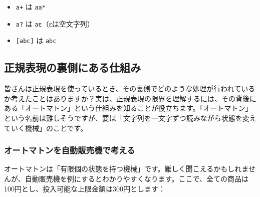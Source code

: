 \begin{itemize}
\tightlist
\item
  \texttt{a+} は \texttt{aa*}
\item
  \texttt{a?} は \texttt{a\textbar{}ε}（εは空文字列）
\item
  \texttt{{[}abc{]}} は \texttt{a\textbar{}b\textbar{}c}
\end{itemize}

\hypertarget{chapter4-ux6b63ux898fux8868ux73feux306eux88cfux5074ux306bux3042ux308bux4ed5ux7d44ux307f}{%
\subsection{正規表現の裏側にある仕組み}\label{chapter4-ux6b63ux898fux8868ux73feux306eux88cfux5074ux306bux3042ux308bux4ed5ux7d44ux307f}}

皆さんは正規表現を使っているとき、その裏側でどのような処理が行われているか考えたことはありますか？実は、正規表現の限界を理解するには、その背後にある「オートマトン」という仕組みを知ることが役立ちます。「オートマトン」という名前は難しそうですが、要は「文字列を一文字ずつ読みながら状態を変えていく機械」のことです。

\hypertarget{chapter4-ux30aaux30fcux30c8ux30deux30c8ux30f3ux3092ux81eaux52d5ux8ca9ux58f2ux6a5fux3067ux8003ux3048ux308b}{%
\subsubsection{オートマトンを自動販売機で考える}\label{chapter4-ux30aaux30fcux30c8ux30deux30c8ux30f3ux3092ux81eaux52d5ux8ca9ux58f2ux6a5fux3067ux8003ux3048ux308b}}

オートマトンは「有限個の状態を持つ機械」です。難しく聞こえるかもしれませんが、自動販売機を例にするとわかりやすくなります。ここで、全ての商品は100円とし、投入可能な上限金額は300円とします：

